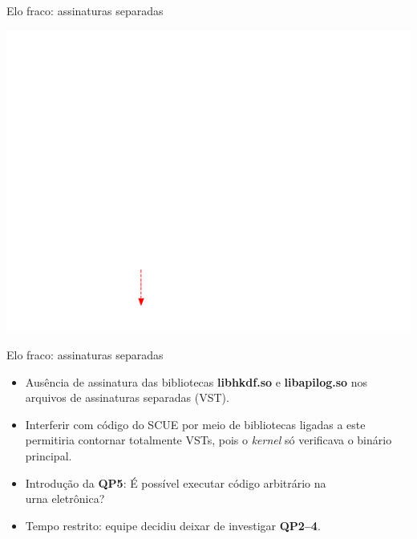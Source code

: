 \documentclass[10pt,xcolor={dvipsnames}]{beamer}
\begin{document}
\begin{frame}{Elo fraco: assinaturas separadas}
\begin{center}
\includegraphics[width=\textwidth,height=0.5\textheight,keepaspectratio]{assinaturas_sistema_weak_link.pdf}
\end{center}
\end{frame}


\begin{frame}{Elo fraco: assinaturas separadas}
  \begin{itemize}
    \item Ausência de assinatura das bibliotecas \textbf{libhkdf.so} e \textbf{libapilog.so} nos arquivos de assinaturas separadas (VST).
    \item Interferir com código do SCUE por meio de bibliotecas ligadas a este permitiria contornar totalmente VSTs, pois o \textit{kernel} só verificava o binário principal.
    \vfill
    \item Introdução da \textbf{QP5}: É possível executar código arbitrário na\\urna eletrônica?
    \item Tempo restrito: equipe decidiu deixar de investigar \textbf{QP2--4}.
  \end{itemize}
\end{frame}
\end{document}
